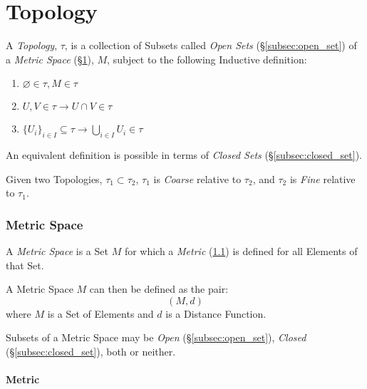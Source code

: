 \documentclass{article}
\begin{document}
\part{Topology}\label{sec:topology}\cite{lc11}

A \emph{Topology}, $\tau$, is a collection of Subsets called
\emph{Open Sets} (\S\ref{subsec:open_set}) of a \emph{Metric Space}
(\S\ref{sec:metric_space}), $M$, subject to the following Inductive
definition:
\begin{enumerate}
\item $\varnothing \in \tau, M \in \tau$
\item $U,V \in \tau \rightarrow U \cap V \in \tau$
\item $\{U_i\}_{i \in I} \subseteq \tau \rightarrow \bigcup_{i \in I}
  U_i \in \tau$
\end{enumerate}

An equivalent definition is possible in terms of \emph{Closed Sets}
(\S\ref{subsec:closed_set}).

Given two Topologies, $\tau_1 \subset \tau_2$, $\tau_1$ is
\emph{Coarse} relative to $\tau_2$, and $\tau_2$ is \emph{Fine}
relative to $\tau_1$.



\section{Metric Space}\label{sec:metric_space}

A \emph{Metric Space} is a Set $M$ for which a \emph{Metric}
(\ref{subsec:metric}) is defined for all Elements of that Set.

A Metric Space $M$ can then be defined as the pair:
\[
    (M,d)
\]
where $M$ is a Set of Elements and $d$ is a Distance Function.

Subsets of a Metric Space may be \emph{Open}
(\S\ref{subsec:open_set}), \emph{Closed} (\S\ref{subsec:closed_set}),
both or neither.



\subsection{Metric}\label{subsec:metric}
\end{document}
